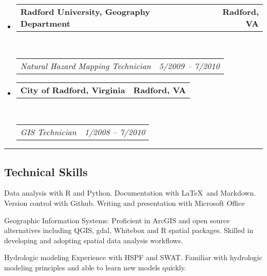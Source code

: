 \documentclass[10pt,letterpaper]{article}
\makeatletter
\newenvironment{indentsection}[1]%
{\begin{list}{}%
		{\setlength{\leftmargin}{#1}}%
		\item[]%
	}
	{\end{list}}
\newcommand{\headerrow}[2]
{\begin{tabular*}{\linewidth}{l@{\extracolsep{\fill}}r}
		#1 &
		#2 \\
\end{tabular*}}
\makeatother
\begin{document}
\begin{itemize}
\begin{itemize*}
		\end{itemize*}
		
		\item
		\headerrow
		{\textbf{Radford University, Geography Department}}
		{\textbf{Radford, VA}}
		\\
		\headerrow
		{\emph{Natural Hazard Mapping Technician}}
		{\emph{5/2009 -- 7/2010}}
		
		\item
		\headerrow
		{\textbf{City of Radford, Virginia}}
		{\textbf{Radford, VA}}
		\\
		\headerrow
		{\emph{GIS Technician}}
		{\emph{1/2008 -- 7/2010}}
		
	\end{itemize}
	
	\hrule
	\vspace{-0.4em}
	\subsection*{Technical Skills}
	
	\begin{indentsection}{\parindent}
		\begin{description*}
			\item[]
			Data analysis with R and Python. Documentation with \LaTeX\ and Markdown. Version control with Github. Writing and presentation with Microsoft Office
			\item[Geographic Information Systems:]
			Proficient in ArcGIS and open source alternatives including QGIS, gdal, Whitebox and R spatial packages. Skilled in developing and adopting spatial data analysis workflows.
			\item[Hydrologic modeling]
			Experience with HSPF and SWAT. Familiar with hydrologic modeling principles and able to learn new models quickly.
		\end{description*}
	\end{indentsection}
	
\end{document}
